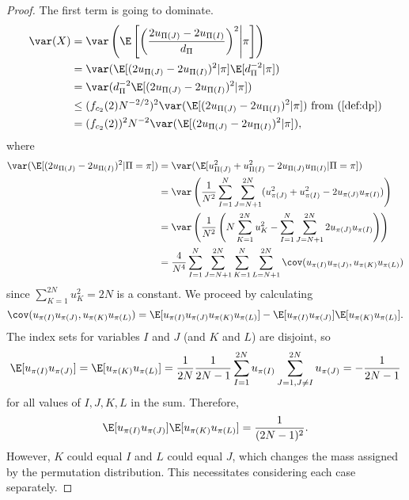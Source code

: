 \begin{proof}
  The first term is going to dominate.
  \begin{align*}
    \var(X) 
    &= \var \left ( \E \left [ \left ( \frac{2u_{\Pi(J)}-2u_{\Pi(I)}}{d_{\Pi}} \right )^2
       \middle | \pi \right ] \right ) \\
   &= \var (\E [(2u_{\Pi(J)}-2u_{\Pi(I)})^2 | \pi ] \E[d_{\Pi}^{-2} | \pi] ) \\
   &= \var (d_{\Pi}^{-2} \E [(2u_{\Pi(J)}-2u_{\Pi(I)})^2 | \pi ]) \\
   &\leq (f_{c_2}(2) N^{-2/2})^2 \var(\E [(2u_{\Pi(J)}-2u_{\Pi(I)})^2 | \pi ]) 
   \text{ from } (\ref{def:dp}) \\
   &= (f_{c_2}(2))^2 N^{-2} \var(\E [(2u_{\Pi(J)}-2u_{\Pi(I)})^2 | \pi ]),
  \end{align*}
  where
  \begin{align*}
    \var (\E[(2u_{\Pi(J)}-2u_{\Pi(I)})^2 | \Pi = \pi]) 
    &= \var(\E[u_{\Pi(J)}^2+u_{\Pi(I)}^2-2u_{\Pi(J)}u_{\Pi(I)}| \Pi = \pi]) \\
    &= \var \left ( \frac{1}{N^2} \sum_{I=1}^{N}\sum_{J=N+1}^{2N}
    (u_{\pi(J)}^2+u_{\pi(I)}^2-2u_{\pi(J)}u_{\pi(I)}) \right ) \\
    &= \var \left ( \frac{1}{N^2} \left ( N \sum_{K=1}^{2N}u_K^2 -
      \sum_{I=1}^{N}\sum_{J=N+1}^{2N}2u_{\pi(J)}u_{\pi(I)} \right ) \right ) \\
    &= \frac{4}{N^4}
    \sum_{I=1}^{N}\sum_{J=N+1}^{2N}\sum_{K=1}^{N}\sum_{L=N+1}^{2N}
    \cov(u_{\pi(I)}u_{\pi(J)},u_{\pi(K)}u_{\pi(L)})
  \end{align*}
  since $\sum_{K=1}^{2N}u_K^2 = 2N$ is a constant.  We proceed by calculating
  \begin{equation*}
    \cov(u_{\pi(I)}u_{\pi(J)},u_{\pi(K)}u_{\pi(L)}) 
    = \E[u_{\pi(I)}u_{\pi(J)}u_{\pi(K)}u_{\pi(L)}] - \E[u_{\pi(I)}u_{\pi(J)}]\E[u_{\pi(K)}u_{\pi(L)}].
  \end{equation*}
  The index sets for variables $I$ and $J$ (and $K$ and $L$) are disjoint, so 
  \begin{equation*}
    \E[u_{\pi(I)}u_{\pi(J)}] = \E[u_{\pi(K)}u_{\pi(L)}]
    = \frac{1}{2N}\frac{1}{2N-1}\sum_{I=1}^{2N} u_{\pi(I)} \sum_{J=1,J\neq I}^{2N} u_{\pi(J)} = -\frac{1}{2N-1}
  \end{equation*}
  for all values of $I, J, K, L$ in the sum.  Therefore, 
  \begin{equation*}
    \E[u_{\pi(I)}u_{\pi(J)}]\E[u_{\pi(K)}u_{\pi(L)}] = \frac{1}{(2N-1)^2}.
  \end{equation*}
  However, $K$ could equal $I$ and $L$ could equal $J$, which changes the mass assigned by the
  permutation distribution.  This necessitates considering each case separately.


\end{proof}
